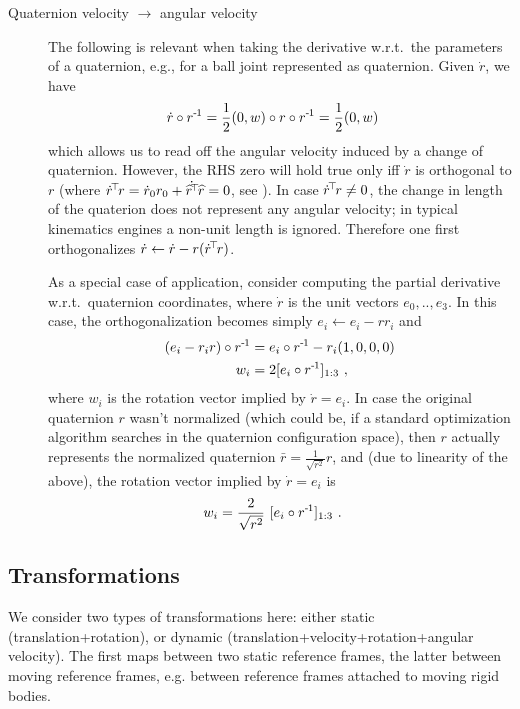 \begin{description}
\item[Quaternion velocity \protect$\to$ angular velocity] The following is
relevant when taking the derivative w.r.t.\ the parameters of a
quaternion, e.g., for a ball joint represented as quaternion. Given
$\dot r$, we have
\begin{align}
\dot r \circ r^{{\hspace*{-.0pt}\text{\rm -}\hspace*{-.5pt}}1}
&= \frac{1}{2} (0,w) \circ r \circ r^{{\hspace*{-.0pt}\text{\rm -}\hspace*{-.5pt}}1} = \frac{1}{2} (0,w)
\end{align}
which allows us to read off the angular velocity induced by a change of
quaternion. However, the RHS zero will hold true only iff $\dot
r$ is orthogonal to $r$ (where $\dot r^{\!\top\!} r = \dot r_0 r_0 + \dot {\widehat
r^{\!\top\!}} \widehat r = 0$, see ). In case $\dot r^{\!\top\!} r \not=0$,
the change in length of the quaterion does not represent any angular
velocity; in typical kinematics engines a non-unit length is
ignored. Therefore one first orthogonalizes $\dot
r \gets \dot r - r(\dot r^{\!\top\!} r)$.

As a special case of application, consider computing the partial
derivative w.r.t.\ quaternion coordinates, where $\dot r$ is the unit
vectors $e_0,..,e_3$. In this case, the orthogonalization becomes
simply $e_i \gets e_i - r r_i$ and
\begin{align}
(e_i - r_i r) \circ r^{{\hspace*{-.0pt}\text{\rm -}\hspace*{-.5pt}}1}
&= e_i \circ r^{{\hspace*{-.0pt}\text{\rm -}\hspace*{-.5pt}}1} - r_i (1,0,0,0) \\
w_i
&= 2 [e_i \circ r^{{\hspace*{-.0pt}\text{\rm -}\hspace*{-.5pt}}1}]_{1:3} ~,
\end{align}
where $w_i$ is the rotation vector implied by $\dot r = e_i$. In case
the original quaternion $r$ wasn't normalized (which could be, if a
standard optimization algorithm searches in the quaternion
configuration space), then $r$ actually represents the normalized
quaternion $\bar r = \frac{1}{\sqrt{r^2}} r$, and (due to linearity of the above), the rotation vector implied by $\dot r = e_i$ is
\begin{align}
w_i
&= \frac{2}{\sqrt{r^2}}~ [e_i \circ r^{{\hspace*{-.0pt}\text{\rm -}\hspace*{-.5pt}}1}]_{1:3} ~.
\end{align}
\end{description}



\subsection{Transformations}

We consider two types of transformations here: either static
(translation+rotation), or dynamic
(translation+velocity+rotation+angular velocity). The first maps
between two static reference frames, the latter between moving
reference frames, e.g. between reference frames attached to moving
rigid bodies.

